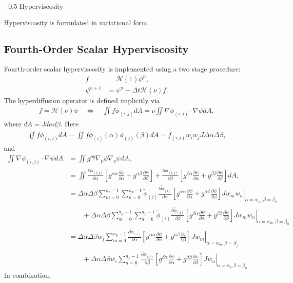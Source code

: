 \documentclass{article}
\makeatletter
\renewcommand\section{\@startsection
  {section}{2}{0mm}%
  {-\baselineskip}%
  {0.5\baselineskip}%
  {\normalfont\Huge\bfseries}}%
\newcommand{\pdiff}[2]{\frac{\partial #1}{\partial #2}}
\makeatother
\begin{document}
\section{Hyperviscosity}

Hyperviscosity is formulated in variational form.

\subsection{Fourth-Order Scalar Hyperviscosity}

Fourth-order scalar hyperviscosity is implemented using a two stage procedure:
\begin{align}
f &= \mathcal{H}(1) \psi^n, \\
\psi^{n+1} &= \psi^n - \Delta t \mathcal{H}(\nu) f.
\end{align}  The hyperdiffusion operator is defined implicitly via
\begin{align}
f = \mathcal{H}(\nu) \psi \quad \Longleftrightarrow \quad \iint f \phi_{(i,j)} dA = \nu \iint \nabla \phi_{(i,j)} \cdot \nabla \psi dA,
\end{align} where $dA = J d\alpha d\beta$.  Here
\begin{align}
\iint f \phi_{(i,j)} dA = \iint f \tilde{\phi}_{(i)}(\alpha) \tilde{\phi}_{(j)}(\beta) dA = f_{(i,j)} w_i w_j J \Delta \alpha \Delta \beta,
\end{align} and
\begin{align}
\iint \nabla \phi_{(i,j)} \cdot \nabla \psi dA &= \iint g^{pq} \nabla_p \phi \nabla_q \psi dA, \\
&= \iint \pdiff{\phi_{(i,j)}}{\alpha} \left[ g^{\alpha \alpha} \pdiff{\psi}{\alpha} + g^{\alpha \beta} \pdiff{\psi}{\beta} \right] + \pdiff{\phi_{(i,j)}}{\beta} \left[ g^{\beta \alpha} \pdiff{\psi}{\alpha} + g^{\beta \beta} \pdiff{\psi}{\beta} \right] dA, \\
&= \Delta \alpha \Delta \beta \sum_{m=0}^{n_p-1} \sum_{n=0}^{n_p-1} \tilde{\phi}_{(j)} \pdiff{\tilde{\phi}_{(i)}}{\alpha} \left. \left[ g^{\alpha \alpha} \pdiff{\psi}{\alpha} + g^{\alpha \beta} \pdiff{\psi}{\beta} \right] J w_m w_n \right\vert_{\alpha = \alpha_m, \beta = \beta_n} \nonumber \\
& \qquad + \Delta \alpha \Delta \beta \sum_{m=0}^{n_p-1} \sum_{n=0}^{n_p-1} \tilde{\phi}_{(i)} \pdiff{\tilde{\phi}_{(j)}}{\beta} \left. \left[ g^{\beta \alpha} \pdiff{\psi}{\alpha} + g^{\beta \beta} \pdiff{\psi}{\beta} \right] J w_m w_n \right\vert_{\alpha = \alpha_m, \beta = \beta_n} \\
&= \Delta \alpha \Delta \beta w_j \sum_{m=0}^{n_p-1} \pdiff{\tilde{\phi}_{(i)}}{\alpha} \left. \left[ g^{\alpha \alpha} \pdiff{\psi}{\alpha} + g^{\alpha \beta} \pdiff{\psi}{\beta} \right] J w_m \right\vert_{\alpha = \alpha_m, \beta = \beta_j} \nonumber \\
& \qquad + \Delta \alpha \Delta \beta w_i \sum_{n=0}^{n_p-1} \pdiff{\tilde{\phi}_{(j)}}{\beta} \left. \left[ g^{\beta \alpha} \pdiff{\psi}{\alpha} + g^{\beta \beta} \pdiff{\psi}{\beta} \right] J w_n \right\vert_{\alpha = \alpha_i, \beta = \beta_n}
\end{align}  In combination,
\end{document}
